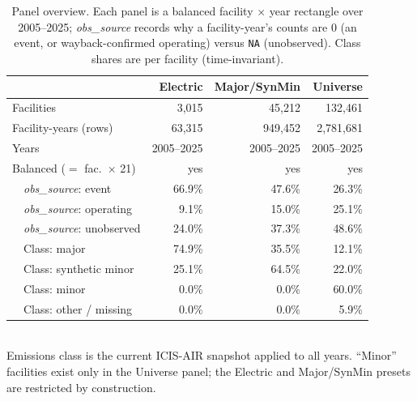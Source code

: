 \begin{table}[htbp]
\centering
\small
\caption{Panel overview. Each panel is a balanced facility $\times$ year rectangle over 2005--2025; \emph{obs\_source} records why a facility-year's counts are $0$ (an event, or wayback-confirmed operating) versus \texttt{NA} (unobserved). Class shares are per facility (time-invariant).}
\label{tab:panel_overview}
\begin{tabular}{lrrr}
\toprule
 & \textbf{Electric} & \textbf{Major/SynMin} & \textbf{Universe} \\
\midrule
Facilities & 3,015 & 45,212 & 132,461 \\
Facility-years (rows) & 63,315 & 949,452 & 2,781,681 \\
Years & 2005--2025 & 2005--2025 & 2005--2025 \\
Balanced ($=$ fac.\ $\times$ 21) & yes & yes & yes \\
\ \ \emph{obs\_source}: event & 66.9\% & 47.6\% & 26.3\% \\
\ \ \emph{obs\_source}: operating & 9.1\% & 15.0\% & 25.1\% \\
\ \ \emph{obs\_source}: unobserved & 24.0\% & 37.3\% & 48.6\% \\
\ \ Class: major & 74.9\% & 35.5\% & 12.1\% \\
\ \ Class: synthetic minor & 25.1\% & 64.5\% & 22.0\% \\
\ \ Class: minor & 0.0\% & 0.0\% & 60.0\% \\
\ \ Class: other / missing & 0.0\% & 0.0\% & 5.9\% \\
\bottomrule
\end{tabular}
\\[2pt]
{\footnotesize Emissions class is the current ICIS-AIR snapshot applied to all years. ``Minor'' facilities exist only in the Universe panel; the Electric and Major/SynMin presets are restricted by construction.}
\end{table}

